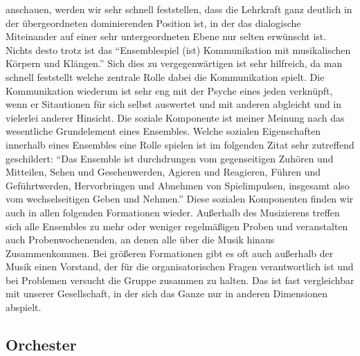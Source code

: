 anschauen, werden wir sehr schnell feststellen, dass die Lehrkraft ganz deutlich
in der übergeordneten dominierenden Position ist, in der das dialogische
Miteinander auf einer sehr untergeordneten Ebene nur selten erwünscht ist.
Nichts desto trotz ist das \enquote{Ensemblespiel (ist) Kommunikation mit
musikalischen Körpern und Klängen.} \autocite[62]{doerne:umfassend_musizieren}
Sich dies zu vergegenwärtigen ist sehr hilfreich, da man schnell feststellt
welche zentrale Rolle dabei die Kommunikation spielt. Die Kommunikation wiederum
ist sehr eng mit der Psyche eines jeden verknüpft, wenn er Sitautionen für sich
selbst auswertet und mit anderen abgleicht und in vielerlei anderer Hinsicht.
Die soziale Komponente ist meiner Meinung nach das wesentliche Grundelement
eines Ensembles. Welche sozialen Eigenschaften innerhalb eines Ensembles eine
Rolle spielen ist im folgenden Zitat sehr zutreffend geschildert: \enquote{Das
Ensemble ist durchdrungen vom gegenseitigen Zuhören und Mitteilen, Sehen und
Gesehenwerden, Agieren und Reagieren, Führen und Geführtwerden, Hervorbringen
und Abnehmen von Spielimpulsen, insgesamt also vom wechselseitigen Geben und
Nehmen.} \autocite[62]{doerne:umfassend_musizieren} Diese sozialen Komponenten
finden wir auch in allen folgenden Formationen wieder. Außerhalb des Musizierens
treffen sich alle Ensembles zu mehr oder weniger regelmäßigen Proben und
veranstalten auch Probenwochenenden, an denen alle über die Musik hinaus
Zusammenkommen. Bei größeren Formationen gibt es oft auch außerhalb der Musik
einen Vorstand, der für die organisatorischen Fragen verantwortlich ist und bei
Problemen versucht die Gruppe zusammen zu halten. Das ist fast vergleichbar mit
unserer Gesellschaft, in der sich das Ganze nur in anderen Dimensionen abspielt.



\subsection{Orchester} 

